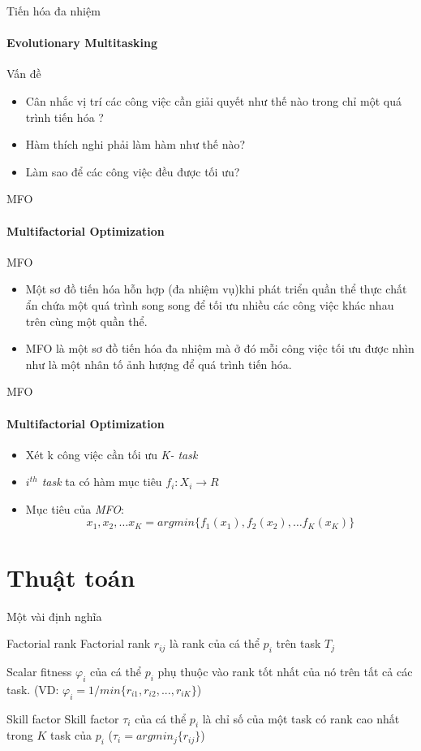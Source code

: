 \documentclass[compress]{beamer}
\begin{document}
\begin{frame}{Tiến hóa đa nhiệm}
\framesubtitle{Evolutionary Multitasking}
\begin{exampleblock}{Vấn đề }
\begin{itemize}
\pause
\item Cân nhắc vị trí các công việc cần giải quyết như thế nào trong chỉ một quá trình tiến hóa ?
\pause
\item Hàm thích nghi phải làm hàm như thế nào? 
\pause
\item Làm sao để các công việc đều được tối ưu?
\end{itemize}
\end{exampleblock}
\end{frame}
\begin{frame}{MFO}
\framesubtitle{Multifactorial Optimization}
\begin{block}{MFO}
\begin{itemize}
\item Một sơ đồ tiến hóa hỗn hợp (đa nhiệm vụ)khi phát triển quần thể  thực chất ẩn chứa một quá trình song song để tối ưu nhiều các công việc khác nhau trên cùng một quần thể.
\pause
\item MFO là một sơ đồ tiến hóa đa nhiệm mà ở đó mỗi công việc tối ưu được nhìn như là một nhân tố ảnh hượng để quá trình tiến hóa.
\end{itemize}
\end{block}
\end{frame}
\begin{frame}{MFO}
\framesubtitle{Multifactorial Optimization}
\begin{itemize}
\item Xét k công việc cần tối ưu \textit{K- task}
\item \textit{$i^{th}$ task} ta có hàm mục tiêu $f_i: X_i \longrightarrow R$
\item Mục tiêu của \textit{MFO}: 
$${x_1, x_2, \ldots x_K}= argmin\{f_1(x_1), f_2(x_2), \ldots f_K(x_K)\}$$
\end{itemize}
\end{frame}

\section{Thuật toán}
\begin{frame}{Một vài định nghĩa}
\begin{block}{Factorial rank}
Factorial rank $r_{ij}$ là rank của cá thể $p_i$ trên task $T_j$
\end{block}
\begin{block}{Scalar fitness} 
${\varphi}_i$ của cá thể $p_i$ phụ thuộc vào rank tốt nhất của nó trên tất cả các task. (VD: ${\varphi}_i = 1/min\{r_{i1}, r_{i2}, ..., r_{iK}\}$)
\end{block}
\begin{block}{Skill factor}
Skill factor ${\tau}_i$ của cá thể $p_i$ là chỉ số của một task có rank cao nhất trong $K$ task của $p_i$ (${\tau}_i = argmin_j\{r_{ij}\}$)
\end{block}
\end{frame} 
\end{document}
